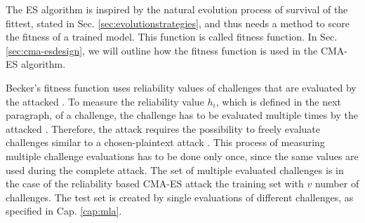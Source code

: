The \ac{ES} algorithm is inspired by the natural evolution process of survival of the fittest, stated in Sec. \ref{sec:evolutionstrategies}, and thus needs a method to score the fitness of a trained model.
This function is called fitness function.
In Sec. \ref{sec:cma-esdesign}, we will outline how the fitness function is used in the \ac{CMA-ES} algorithm.


Becker's fitness function uses reliability values of challenges that are evaluated by the attacked \puf.
To measure the reliability value $h_i$, which is defined in the next paragraph, of a challenge, the challenge has to be evaluated multiple times by the attacked \puf.
Therefore, the attack requires the possibility to freely evaluate challenges similar to a chosen-plaintext attack \cite{Wikipedia2016Chosen-plaintextAttack}.
This process of measuring multiple challenge evaluations has to be done only once, since the same values are used during the complete attack. %
The set of multiple evaluated challenges is in the case of the reliability based \ac{CMA-ES} attack the training set with $v$ number of challenges.
The test set is created by single evaluations of different challenges, as specified in Cap. \ref{cap:mla}.




